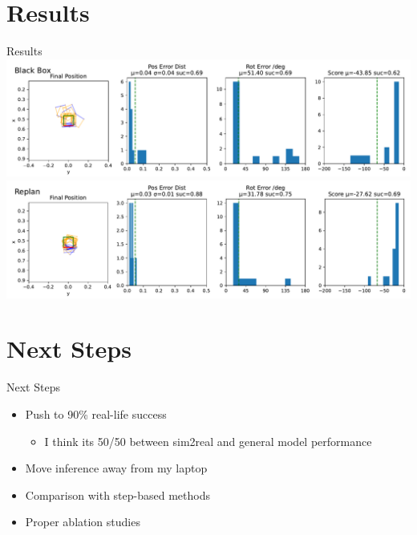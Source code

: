 \documentclass[16:9,en,navbarinfooter]{sdqbeamer}
\begin{document}
\section{Results}
\begin{frame}{Results}
\center
    \includegraphics[width=.7\linewidth]{media/blackbox_presentation.pdf}\\
    \includegraphics[width=.7\linewidth]{media/replan_presentation.pdf}
\end{frame}

\section{Next Steps}
\begin{frame}{Next Steps}

    \begin{itemize}
        \item Push to 90\% real-life success 
        \begin{itemize}
                \item I think its 50/50 between sim2real and general model performance
        \end{itemize}
        \item Move inference away from my laptop 
        \item Comparison with step-based methods
        \item Proper ablation studies
    \end{itemize}
\end{frame}


\appendix
\beginbackup{}

\backupend{}
\end{document}
